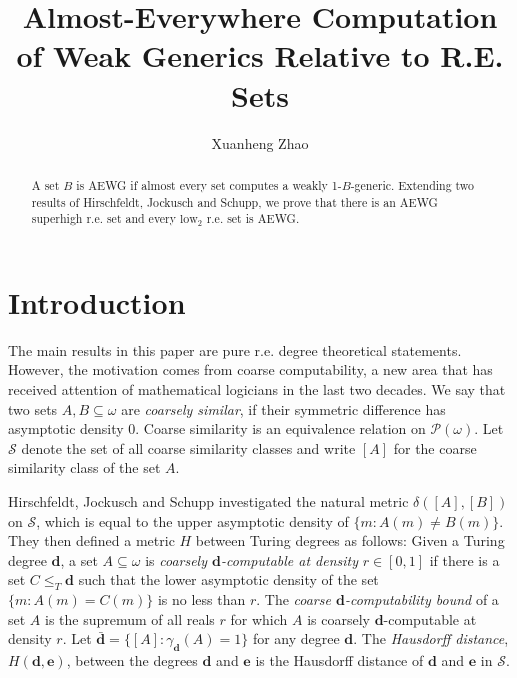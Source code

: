 \documentclass[11pt]{amsart}
\begin{document}

\title[AEWG r.e. sets]{Almost-Everywhere Computation of Weak Generics Relative to R.E. Sets}

\author{Xuanheng Zhao}
\address{School of Mathematics\\
 Nanjing University\\
 Nanjing, Jiangsu 210093, People's Republic of China}


\begin{abstract}
  A set $B$ is AEWG if almost every set computes a weakly
  1-$B$-generic. Extending two results of Hirschfeldt, Jockusch and Schupp, we prove that there is an AEWG superhigh r.e. set and every $\text{low}_2$ r.e. set is AEWG.
\end{abstract}

{\maketitle}

\section{Introduction}

The main results in this paper are pure r.e. degree theoretical statements.
However, the motivation comes from coarse computability, a new area that has
received attention of mathematical logicians in the last two decades.
We say that two sets $A, B \subseteq \omega$ are {\emph{coarsely similar}}, if their symmetric difference has asymptotic density 0. Coarse similarity is an equivalence relation on $\mathcal{P} (\omega)$.
Let $\mathcal{S}$ denote the set of all coarse similarity classes and write
$[A]$ for the coarse similarity class of the set $A$. 

Hirschfeldt, Jockusch
and Schupp {\cite{MR4741732}} investigated the natural metric $\delta ([A], [B])$ on $\mathcal{S}$, which is equal to the upper asymptotic density of $\{ m: A (m)
   \neq B (m) \}$. They then defined a metric $H$
between Turing degrees as follows:
Given a Turing degree $\mathbf{d}$, a set $A \subseteq \omega$ is
{\emph{coarsely $\mathbf{d}$-computable at density}} $r \in [0, 1]$ if there
is a set $C \leq_T \mathbf{d}$ such that the lower asymptotic density of the set $\{m:A(m)=C(m)\}$ is no less than $r$.
The {\emph{coarse $\mathbf{d}$-computability bound}} of a set $A$ is
 the supremum of all reals $r$ for which $A$ is coarsely $\mathbf{d}$-computable at density $r$.
Let $\bar{\mathbf{d}} = \{ [A] : \gamma_{\mathbf{d}} (A) = 1 \}$ for any
degree $\mathbf{d}$. The {\emph{Hausdorff distance}}, $H (\mathbf{d}, \mathbf{e})$,
between the degrees $\mathbf{d}$ and $\mathbf{e}$ is the Hausdorff distance of $\mathbf{d}$ and $\mathbf{e}$ in $\mathcal{S}$.
\end{document}
